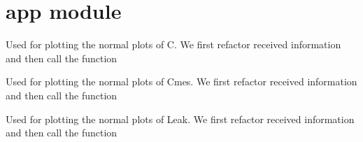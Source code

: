 \documentclass[letterpaper,10pt,english]{sphinxmanual}
\begin{document}
\sphinxstepscope


\chapter{app module}
\label{\detokenize{app:module-app}}\label{\detokenize{app:app-module}}\label{\detokenize{app::doc}}

\begin{fulllineitems}
\label{\detokenize{app:app.C_normal}}
\pysigstartsignatures
{}
\pysigstopsignatures
\sphinxAtStartPar
Used for plotting the normal plots of C.
We first refactor received information and then call the function

\end{fulllineitems}


\begin{fulllineitems}
\label{\detokenize{app:app.Cmes_normal}}
\pysigstartsignatures
{}
\pysigstopsignatures
\sphinxAtStartPar
Used for plotting the normal plots of Cmes.
We first refactor received information and then call the function

\end{fulllineitems}


\begin{fulllineitems}
\label{\detokenize{app:app.Leak_normal}}
\pysigstartsignatures
{}
\pysigstopsignatures
\sphinxAtStartPar
Used for plotting the normal plots of Leak.
We first refactor received information and then call the function

\end{fulllineitems}
\end{document}
